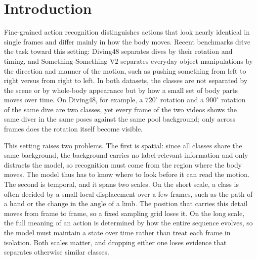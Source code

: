 \section{Introduction}
\label{sec:intro}

Fine-grained action recognition distinguishes actions that look nearly
identical in single frames and differ mainly in how the body moves. Recent
benchmarks drive the task toward this setting: Diving48 \cite{diving48}
separates dives by their rotation and timing, and Something-Something V2
\cite{goyal2017ssv2} separates everyday object manipulations by the direction
and manner of the motion, such as pushing something from left to right versus
from right to left. In both datasets, the classes are not separated by the
scene or by whole-body appearance but by how a small set of body parts moves
over time. On Diving48, for example, a $720^\circ$ rotation and a $900^\circ$
rotation of the same dive are two classes, yet every frame of the two videos
shows the same diver in the same poses against the same pool background; only
across frames does the rotation itself become visible.

This setting raises two problems. The first is spatial: since all classes
share the same background, the background carries no label-relevant
information and only distracts the model, so recognition must come from the
region where the body moves. The model thus has to know where to look before
it can read the motion. The second is temporal, and it spans two scales. On
the short scale, a class is often decided by a small local displacement over
a few frames, such as the path of a hand or the change in the angle of a limb.
The position that carries this detail moves from frame to frame, so a fixed
sampling grid loses it. On the long scale, the full meaning of an action is
determined by how the entire sequence evolves, so the model must maintain a
state over time rather than treat each frame in isolation. Both scales matter,
and dropping either one loses evidence that separates otherwise similar
classes.

